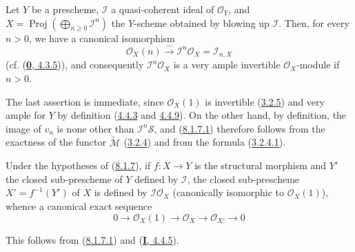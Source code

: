 
\begin{proposition}[8.1.7]
\label{II.8.1.7}
Let $Y$ be a prescheme, $\mathcal{I}$ a quasi-coherent ideal of
$\mathcal{O}_Y$, and $X=\operatorname{Proj}(\bigoplus_{n\geq0}\mathcal{I}^n)$ the
$Y$-scheme obtained by blowing up $\mathcal{I}$. Then, for every
$n>0$, we have a canonical isomorphism
\begin{equation}
\label{II.8.1.7.1}
  \mathcal{O}_X(n)\xrightarrow{\sim}\mathcal{I}^n\mathcal{O}_X
  =\mathcal{I}_{n,X}
\tag{8.1.7.1}
\end{equation}
(cf. \textup{(\hyperref[0.4.3.5]{\textbf{0}, 4.3.5})}), and consequently
$\mathcal{I}^n\mathcal{O}_X$ is a very ample invertible $\mathcal{O}_X$-module
if $n>0$.
\end{proposition}

The last assertion is immediate, since $\mathcal{O}_X(1)$ is invertible
(\hyperref[II.3.2.5]{3.2.5}) and very ample for $Y$ by definition
(\hyperref[II.4.4.3]{4.4.3} and \hyperref[II.4.4.9]{4.4.9}). On the
other hand, by definition, the image of $v_n$ is none other than
$\mathcal{I}^n\mathcal{S}$, and (\hyperref[II.8.1.7.1]{8.1.7.1}) therefore follows
from the exactness of the functor $\widetilde{\mathcal{M}}$
(\hyperref[II.3.2.4]{3.2.4}) and from the formula
(\hyperref[II.3.2.4.1]{3.2.4.1}).

\begin{corollary}[8.1.8]
\label{II.8.1.8}
Under the hypotheses of \textup{(\hyperref[II.8.1.7]{8.1.7})}, if $f:X\to Y$ is the
structural morphism and $Y'$ the closed sub-prescheme of $Y$ defined by
$\mathcal{I}$, the closed sub-prescheme $X'=f^{-1}(Y')$ of $X$ is defined by
$\mathcal{I}\mathcal{O}_X$ (canonically isomorphic to $\mathcal{O}_X(1)$),
whence a canonical exact sequence
\begin{equation}
\label{II.8.1.8.1}
  0\to\mathcal{O}_X(1)\to\mathcal{O}_X\to\mathcal{O}_{X'}\to0
\tag{8.1.8.1}
\end{equation}
\end{corollary}

This follows from (\hyperref[II.8.1.7.1]{8.1.7.1}) and
(\hyperref[I.4.4.5]{\textbf{I}, 4.4.5}).

